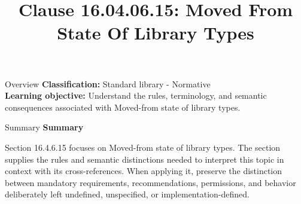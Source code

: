 \documentclass[10pt,letterpaper]{article}
\title{Clause 16.04.06.15: Moved From State Of Library Types}
\author{}
\date{}
\begin{document}
\maketitle
\begin{CornellOverviewBox}{Overview}
\textbf{Classification:} Standard library - Normative\\[2pt]
\textbf{Learning objective:} Understand the rules, terminology, and semantic consequences associated with Moved-from state of library types.
\end{CornellOverviewBox}\begin{CornellSummaryBox}{Summary}
{\sffamily\bfseries\color{Accent} Summary}\par\vspace{3pt}Section 16.4.6.15 focuses on Moved-from state of library types. The section supplies the rules and semantic distinctions needed to interpret this topic in context with its cross-references. When applying it, preserve the distinction between mandatory requirements, recommendations, permissions, and behavior deliberately left undefined, unspecified, or implementation-defined.
\end{CornellSummaryBox}
\end{document}
